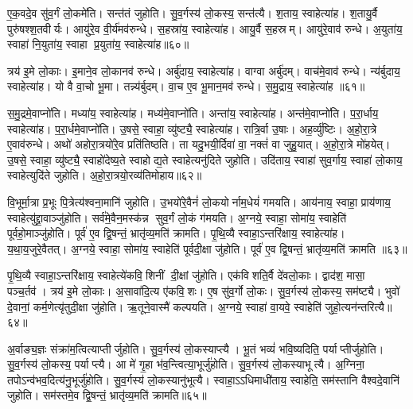 ए॒क॒वदे॒व सु॑व॒र्गं लो॒कमे॑ति। सन्त॑तं जुहोति। सु॒व॒र्गस्य॑ लो॒कस्य॒ सन्त॑त्यै। श॒ताय॒ स्वाहेत्या॑ह। श॒तायु॒र्वै पुरु॑षश्श॒तवीर्यः। आयु॑रे॒व वी॒र्य॑मव॑रुन्धे। स॒हस्रा॑य॒ स्वाहेत्या॑ह। आयु॒र्वै स॒हस्रम्। आयु॑रे॒वाव॑ रुन्धे। अ॒युता॑य॒ स्वाहा॑ नि॒युता॑य॒ स्वाहा प्र॒युता॑य॒ स्वाहेत्या॑ह॥६०॥

त्रय॑ इ॒मे लो॒काः। इ॒माने॒व लो॒कानव॑ रुन्धे। अर्बु॑दाय॒ स्वाहेत्या॑ह। वाग्वा अर्बु॑दम्। वाच॑मे॒वाव॑ रुन्धे। न्य॑र्बुदाय॒ स्वाहेत्या॑ह। यो वै वा॒चो भू॒मा। तन्न्य॑र्बुदम्। वा॒च ए॒व भू॒मान॒मव॑ रुन्धे। स॒मु॒द्राय॒ स्वाहेत्या॑ह ॥६१॥

स॒मु॒द्रमे॒वाप्नो॑ति। मध्या॑य॒ स्वाहेत्या॑ह। मध्य॑मे॒वाप्नो॑ति। अन्ता॑य॒ स्वाहेत्या॑ह। अन्त॑मे॒वाप्नो॑ति। प॒रा॒र्धाय॒ स्वाहेत्या॑ह। प॒रा॒र्धमे॒वाप्नो॑ति। उ॒षसे॒ स्वाहा॒ व्यु॑ष्ट्यै॒ स्वाहेत्या॑ह। रात्रि॒र्वा उ॒षाः। अह॒र्व्यु॑ष्टिः। अ॒हो॒रा॒त्रे ए॒वाव॑रुन्धे। अथो॑ अहोरा॒त्रयो॑रे॒व प्रति॑तिष्ठति। ता यदु॒भयी॒र्दिवा॑ वा॒ नक्तं॑ वा जुहु॒यात्। अ॒हो॒रा॒त्रे मो॑हयेत्। उ॒षसे॒ स्वाहा॒ व्यु॑ष्ट्यै॒ स्वाहो॑देष्य॒ते स्वाहोद्य॒ते स्वाहेत्यनु॑दिते जुहोति। उदि॑ताय॒ स्वाहा॑ सुव॒र्गाय॒ स्वाहा॑ लो॒काय॒ स्वाहेत्युदि॑ते जुहोति। अ॒हो॒रा॒त्रयो॒रव्य॑तिमोहाय॥६२॥\anuvakamend[ए॒को॒त्त॒रं जु॑होति प्र॒युता॑य॒ स्वाहेत्या॑ह समु॒द्राय॒ स्वाहेत्या॒हाह॒र्व्यु॑ष्टिः स॒प्त च॑]

वि॒भूर्मा॒त्रा प्र॒भूः पि॒त्रेत्य॑श्वना॒मानि॑ जुहोति। उ॒भयो॑रे॒वैनं॑ लो॒कयोर्नाम॒धेयं॑ गमयति। आय॑नाय॒ स्वाहा॒ प्राय॑णाय॒ स्वाहेत्यु॑द्द्रा॒वाञ्जु॑होति। सर्व॑मे॒वैन॒मस्क॑न्न सुव॒र्गं लो॒कं ग॑मयति। अ॒ग्नये॒ स्वाहा॒ सोमा॑य॒ स्वाहेति॑ पूर्वहो॒माञ्जु॑होति। पूर्व॑ ए॒व द्वि॒षन्तं॒ भ्रातृ॑व्य॒मति॑ क्रामति। पृ॒थि॒व्यै स्वाहा॒ऽन्तरि॑क्षाय॒ स्वाहेत्या॑ह। य॒था॒य॒जुरे॒वैतत्। अ॒ग्नये॒ स्वाहा॒ सोमा॑य॒ स्वाहेति॑ पूर्वदी॒क्षा जु॑होति। पूर्व॑ ए॒व द्वि॒षन्तं॒ भ्रातृ॑व्य॒मति॑ क्रामति ॥६३॥

पृ॒थि॒व्यै स्वाहा॒ऽन्तरि॑क्षाय॒ स्वाहेत्ये॑कवि॒शिनीं दी॒क्षां जु॑होति। एक॑विशति॒र्वै दे॑वलो॒काः। द्वाद॑श॒ मासा॒ पञ्च॒र्तव॑। त्रय॑ इ॒मे लो॒काः। अ॒सावा॑दि॒त्य ए॑कवि॒शः। ए॒ष सु॑व॒र्गो लो॒कः। सु॒व॒र्गस्य॑ लो॒कस्य॒ सम॑ष्ट्यै। भुवो॑ दे॒वानां॒ कर्म॒णेत्यृ॑तुदी॒क्षा जु॑होति। ऋ॒तूने॒वास्मै॑ कल्पयति। अ॒ग्नये॒ स्वाहा॑ वा॒यवे॒ स्वाहेति॑ जुहो॒त्यन॑न्तरित्यै॥६४॥

अ॒र्वाङ्य॒ज्ञः संक्रा॑म॒त्वित्याप्तीर्जुहोति। सु॒व॒र्गस्य॑ लो॒कस्याप्त्यै। भू॒तं भव्यं॑ भवि॒ष्यदिति॒ पर्याप्तीर्जुहोति। सु॒व॒र्गस्य॑ लो॒कस्य॒ पर्याप्त्यै। आ मे॑ गृ॒हा भ॑व॒न्त्वित्या॒भूर्जु॑होति। सु॒व॒र्गस्य॑ लो॒कस्याभूत्यै। अ॒ग्निना॒ तपोऽन्व॑भव॒दित्य॑नु॒भूर्जु॑होति। सु॒व॒र्गस्य॑ लो॒कस्यानु॑भूत्यै। स्वाहा॒ऽऽधिमाधी॑ताय॒ स्वाहेति॒ सम॑स्तानि वैश्वदे॒वानि॑ जुहोति। सम॑स्तमे॒व द्वि॒षन्तं॒ भ्रातृ॑व्य॒मति॑ क्रामति॥६५॥

